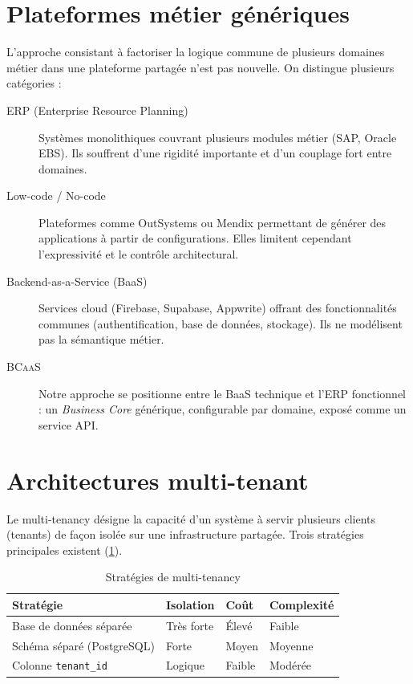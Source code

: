 \documentclass[12pt,a4paper]{report}
\theoremstyle{definition}
\theoremstyle{remark}
\newcommand{\bcaas}{\textsc{BCaaS}}
\newcommand{\api}{\textsc{API}}
\begin{document}
\section{Plateformes métier génériques}

L'approche consistant à factoriser la logique commune de plusieurs domaines métier dans une plateforme partagée n'est pas nouvelle. On distingue plusieurs catégories :

\begin{description}
	\item[ERP (Enterprise Resource Planning)] Systèmes monolithiques couvrant plusieurs modules métier (SAP, Oracle EBS). Ils souffrent d'une rigidité importante et d'un couplage fort entre domaines.
	\item[Low-code / No-code] Plateformes comme OutSystems ou Mendix permettant de générer des applications à partir de configurations. Elles limitent cependant l'expressivité et le contrôle architectural.
	\item[Backend-as-a-Service (BaaS)] Services cloud (Firebase, Supabase, Appwrite) offrant des fonctionnalités communes (authentification, base de données, stockage). Ils ne modélisent pas la sémantique métier.
	\item[\bcaas{}] Notre approche se positionne entre le BaaS technique et l'ERP fonctionnel : un \textit{Business Core} générique, configurable par domaine, exposé comme un service \api.
\end{description}

\section{Architectures multi-tenant}

Le multi-tenancy désigne la capacité d'un système à servir plusieurs clients (tenants) de façon isolée sur une infrastructure partagée. Trois stratégies principales existent (\cref{tab:multitenancy}).

\begin{table}[h]
	\centering
	\caption{Stratégies de multi-tenancy}
	\label{tab:multitenancy}
	\begin{tabularx}{\textwidth}{lXXX}
		\toprule
		\textbf{Stratégie} & \textbf{Isolation} & \textbf{Coût} & \textbf{Complexité} \\
		\midrule
		Base de données séparée & Très forte & Élevé & Faible \\
		Schéma séparé (PostgreSQL) & Forte & Moyen & Moyenne \\
		Colonne \texttt{tenant\_id} & Logique & Faible & Modérée \\
		\bottomrule
	\end{tabularx}
\end{table}
\end{document}
